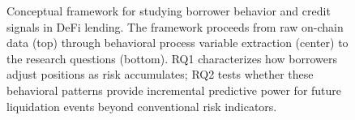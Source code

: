 \begin{figure}[t]
{%
}
\caption{Conceptual framework for studying borrower behavior and credit signals in DeFi lending. The framework proceeds from raw on-chain data (top) through behavioral process variable extraction (center) to the research questions (bottom). RQ1 characterizes how borrowers adjust positions as risk accumulates; RQ2 tests whether these behavioral patterns provide incremental predictive power for future liquidation events beyond conventional risk indicators.}
\label{fig:framework}
\end{figure}



